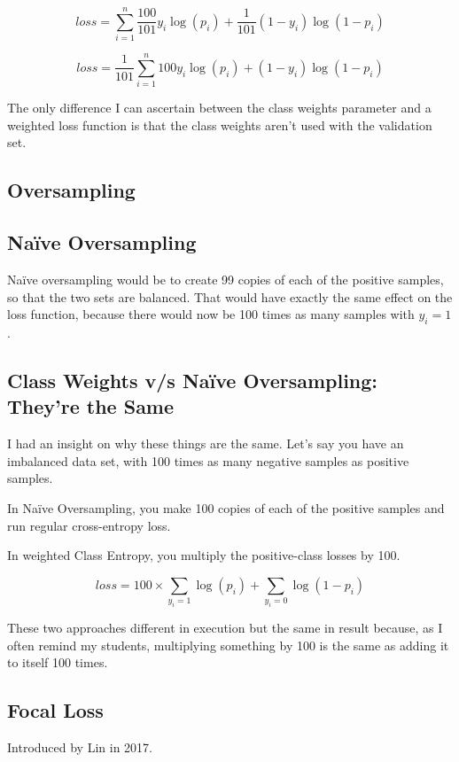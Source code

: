 $$loss = \sum_{i=1}^n \frac{100}{101} y_i \log(p_i) + \frac{1}{101} (1-y_i) \log (1 - p_i)$$

$$loss = \frac{1}{101}\sum_{i=1}^n 100 y_i \log(p_i) + (1-y_i) \log (1 - p_i)$$

The only difference I can ascertain between the class weights parameter and a weighted loss function is that the class weights aren't used with the validation set.  

\subsection{Oversampling}
\subsection{Na\"{i}ve Oversampling}

Na\"{i}ve oversampling would be to create 99 copies of each of the positive samples, so that the two sets are balanced.  That would have exactly the same effect on the loss function, because there would now be 100 times as many samples with $y_i=1$.  

\subsection{Class Weights v/s Na\"{i}ve Oversampling: They're the Same}

I had an insight on why these things are the same.  Let's say you have an imbalanced data set, with 100 times as many negative samples as positive samples.  

In Na\"{i}ve Oversampling, you make 100 copies of each of the positive samples and run regular cross-entropy loss.  

In weighted Class Entropy, you multiply the positive-class losses by 100.

$$loss = 100 \times \sum_{y_i=1} \log (p_i) +  \sum_{y_i=0} \log (1-p_i)$$

These two approaches different in execution but the same in result because, as I often remind my students, multiplying something by 100 is the same as adding it to itself 100 times.  



\subsection{Focal Loss}

Introduced by Lin in 2017.  \cite{LIN_2020}

